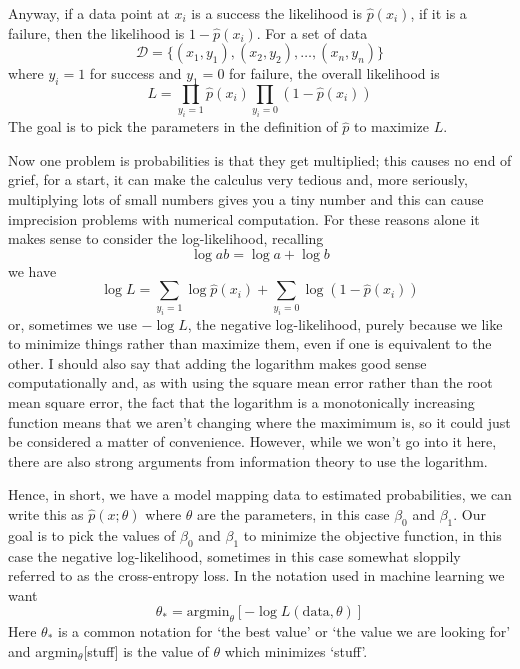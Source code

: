 \documentclass[12pt]{article}
\begin{document}
Anyway, if a data point at $x_i$ is a success the likelihood is
$\hat{p}(x_i)$, if it is a failure, then the likelihood is
$1-\hat{p}(x_i)$.
For a set of data
\begin{equation}
  \mathcal{D}=\{(x_1,y_1),(x_2,y_2),\ldots,(x_n,y_n)\}
\end{equation}
where $y_i=1$ for success and $y_1=0$ for failure, the overall
likelihood is
\begin{equation}
  L=\prod_{y_i=1}\hat{p}(x_i)\prod_{y_i=0}(1-\hat{p}(x_i))
\end{equation}
The goal is to pick the parameters in the definition of $\hat{p}$ to
maximize $L$.

Now one problem is probabilities is that they get
multiplied; this causes no end of grief, for a start, it can make the
calculus very tedious and, more seriously, multiplying lots of small
numbers gives you a tiny number and this can cause imprecision
problems with numerical computation. For these reasons alone it makes
sense to consider the log-likelihood, recalling
\begin{equation}
  \log{ab}=\log{a}+\log{b}
\end{equation}
we have
\begin{equation}
  \log{L}=\sum_{y_i=1}\log\hat{p}(x_i)+\sum_{y_i=0}\log(1-\hat{p}(x_i))
\end{equation}
or, sometimes we use $-\log{L}$, the negative log-likelihood, purely
because we like to minimize things rather than maximize them, even if
one is equivalent to the other. I should also say that adding the
logarithm makes good sense computationally and, as with using the
square mean error rather than the root mean square error, the fact
that the logarithm is a monotonically increasing function means that
we aren't changing where the maximimum is, so it could just be
considered a matter of convenience. However, while we won't go into it
here, there are also strong arguments from information theory to use
the logarithm.

Hence, in short, we have a model mapping data to estimated
probabilities, we can write this as $\hat{p}(x;\theta)$ where $\theta$
are the parameters, in this case $\beta_0$ and $\beta_1$. Our goal is
to pick the values of $\beta_0$ and $\beta_1$ to minimize the
objective function, in this case the negative log-likelihood,
sometimes in this case somewhat sloppily referred to as the
cross-entropy loss. In the notation used in machine learning we want
\begin{equation}
  \theta_*=\text{argmin}_\theta [-\log{L(\text{data},\theta)}]
\end{equation}
Here $\theta_*$ is a common notation for `the best value' or `the
value we are looking for' and argmin$_\theta$[stuff] is the value of
$\theta$ which minimizes `stuff'.
\end{document}
